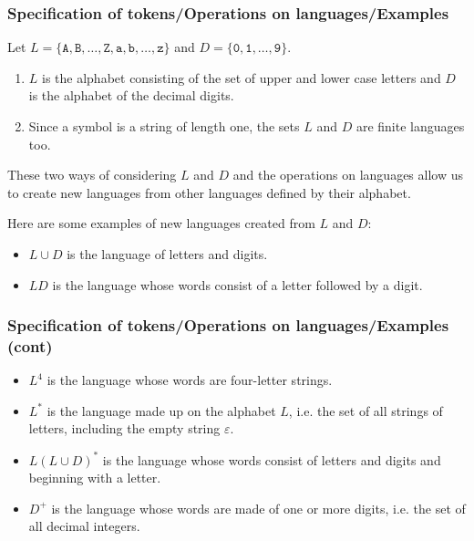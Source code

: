% 
\begin{frame}
\frametitle{Specification of tokens/Operations on languages/Examples}

Let \(L
= \{\texttt{A}, \texttt{B}, \ldots, \texttt{Z}, \texttt{a}, \texttt{b}, \ldots, \texttt{z}\}\)
and \(D = \{\texttt{0}, \texttt{1}, \ldots, \texttt{9}\}\). 
\begin{enumerate}

  \item \(L\) is the alphabet consisting of the set of upper and lower
  case letters and \(D\) is the alphabet of the decimal digits.

  \item Since a symbol is a string of length one, the sets \(L\)
  and \(D\) are finite languages too.

\end{enumerate}
These two ways of considering \(L\) and \(D\) and the operations on
languages allow us to create new languages from other languages
defined by their alphabet.

\bigskip

Here are some examples of new languages created from \(L\) and \(D\):
\begin{itemize}

  \item \(L \cup D\) is the language of letters and digits.

  \item \(L D\) is the language whose words consist of a letter followed
  by a digit.

\end{itemize}

\end{frame}

% 
\begin{frame}
\frametitle{Specification of tokens/Operations on languages/Examples
  (cont)}

\begin{itemize}

  \item \(L^{4}\) is the language whose words are four-letter strings.

  \item \(L^{*}\) is the language made up on the alphabet \(L\),
  i.e. the set of all strings of letters, including the empty
  string \(\varepsilon\).

  \item \(L(L \cup D)^{*}\) is the language whose words consist of
  letters and digits and beginning with a letter.

  \item \(D^{+}\) is the language whose words are made of one or more
  digits, i.e. the set of all decimal integers.

\end{itemize}

\end{frame}
